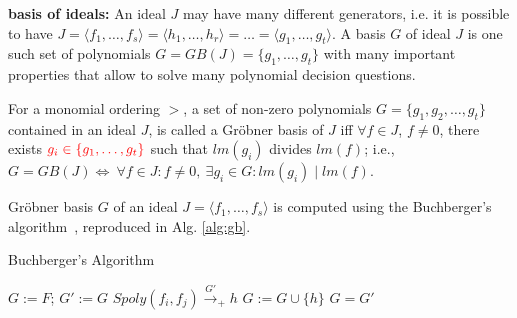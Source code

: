 {\bf \Grobner basis of ideals:} An ideal $J$ may have many different
generators, i.e. it is possible to have  $J = \langle f_1, \dots,
f_s\rangle = \langle h_1,\dots, h_r\rangle = \dots = \langle g_1,
\dots, g_t \rangle$. A \Grobner basis $G$ of ideal $J$ is one such set
of polynomials $G = GB(J) = \{g_1, \dots, g_t\}$ with many important
properties that allow to solve many polynomial decision questions. 

\begin{Definition}
\label{def:gb}
For a monomial ordering $>$, a set  of non-zero polynomials $G =
\{g_1,g_2,\dots,g_t\}$ contained in an ideal $J$, is called a
Gr\"{o}bner basis of $J$ iff 
$\forall f \in J$, $f\neq 0$, there exists $\textcolor{red}{g_i \in 
\{g_1,\dots, g_t\}}$ such
that $lm(g_i)$ divides $lm(f)$; i.e., 
$G = GB(J) \Leftrightarrow\  \forall f \in J : f \neq 0, \ \exists g_i \in G :
lm(g_i)\mid lm(f)$. 

\end{Definition}


\par Gr\"obner basis $G$ of an ideal $J = \langle
f_1,\dots,f_s\rangle$ is computed using the Buchberger's
algorithm~\cite{buchberger_thesis}, 
reproduced in Alg. \ref{alg:gb}.

\begin{algorithm}
\caption {Buchberger's Algorithm}
\label{alg:gb}
\begin{algorithmic}[1]
  \State $G:= F$;
  \Repeat
    \State $G' := G$
      \State $Spoly(f_i, f_j) \stackrel{G'}{\textstyle\longrightarrow}_+h$ 
       \State $G:= G \cup \{h\}$ \EndIf
    \EndFor
  \Until $G = G'$
\end{algorithmic}
\end{algorithm}


